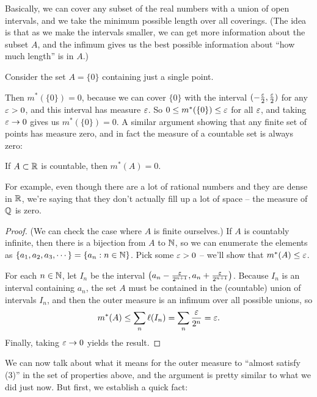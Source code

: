 Basically, we can cover any subset of the real numbers with a union of open intervals, and we take the minimum possible length over all coverings. (The idea is that as we make the intervals smaller, we can get more information about the subset $A$, and the infimum gives us the best possible information about ``how much length'' is in $A$.)

\begin{example}
Consider the set $A = \{0\}$ containing just a single point. 
\end{example}

Then $m^\ast(\{0\}) = 0$, because we can cover $\{0\}$ with the interval $(-\frac{\varepsilon}{2}, \frac{\varepsilon}{2})$ for any $\varepsilon > 0$, and this interval has measure $\varepsilon$. So $0 \le m^\ast(\{0\}) \le \varepsilon$ for all $\varepsilon$, and taking $\varepsilon \to 0$ gives us $m^\ast(\{0\}) = 0$. A similar argument showing that any finite set of points has measure zero, and in fact the measure of a countable set is always zero:

\begin{theorem}\label{meascountab}
If $A \subset \mathbb R$ is countable, then $m^\ast(A) = 0$.
\end{theorem}

For example, even though there are a lot of rational numbers and they are dense in $\mathbb R$, we're saying that they don't actually fill up a lot of space -- the measure of $\mathbb Q$ is zero. 

\begin{proof}
(We can check the case where $A$ is finite ourselves.) If $A$ is countably infinite, then there is a bijection from $A$ to $\mathbb N$, so we can enumerate the elements as $\{a_1, a_2, a_3, \cdots\} = \{a_n: n \in \mathbb N\}$. Pick some $\varepsilon > 0$ -- we'll show that $m^\ast(A) \le \varepsilon$. 

For each $n \in \mathbb N$, let $I_n$ be the interval $\left(a_n - \frac{\varepsilon}{2^{n+1}}, a_n + \frac{\varepsilon}{2^{n+1}}\right)$. Because $I_n$ is an interval containing $a_n$, the set $A$ must be contained in the (countable) union of intervals $I_n$, and then the outer measure is an infimum over all possible unions, so 
\[
    m^\ast(A) \le \sum_n \ell(I_n) = \sum_n \frac{\varepsilon}{2^n} = \varepsilon.
\]
Finally, taking $\varepsilon \to 0$ yields the result.
\end{proof}

We can now talk about what it means for the outer measure to ``almost satisfy (3)'' in the set of properties above, and the argument is pretty similar to what we did just now. But first, we establish a quick fact:

